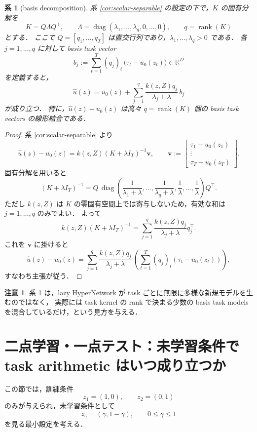 \documentclass[a4paper,11pt]{bxjsarticle}
\newtheorem{corollary}[theorem]{系}
\theoremstyle{definition}
\newtheorem{remark}[theorem]{注意}
\DeclareMathOperator{\rank}{rank}
\DeclareMathOperator{\diag}{diag}
\begin{document}
\begin{corollary}[basis decomposition]
\label{cor:basis-decomposition}
系 \ref{cor:scalar-separable} の設定の下で，$K$ の固有分解を
\[
K = Q\Lambda Q^\top,\qquad
\Lambda=\diag(\lambda_1,\dots,\lambda_q,0,\dots,0),\qquad q=\rank(K)
\]
とする．
ここで $Q=[q_1,\dots,q_T]$ は直交行列であり，$\lambda_1,\dots,\lambda_q>0$ である．
各 $j=1,\dots,q$ に対して basis task vector
\[
b_j:=\sum_{t=1}^T (q_j)_t\,\bigl(\tau_t-u_0(z_t)\bigr)\in\mathbb{R}^D
\]
を定義すると，
\[
\hat u(z)
=
u_0(z)+\sum_{j=1}^q \frac{k(z,Z)q_j}{\lambda_j+\lambda}\,b_j
\]
が成り立つ．
特に，$\hat u(z)-u_0(z)$ は高々 $q=\rank(K)$ 個の basis task vectors の線形結合である．
\end{corollary}

\begin{proof}
系 \ref{cor:scalar-separable} より
\[
\hat u(z)-u_0(z)
=
k(z,Z)(K+\lambda I_T)^{-1}\mathbf{v},
\qquad
\mathbf{v}:=
\begin{bmatrix}
\tau_1-u_0(z_1)\\
\vdots\\
\tau_T-u_0(z_T)
\end{bmatrix}.
\]
固有分解を用いると
\[
(K+\lambda I_T)^{-1}
=
Q\,\diag\!\left(\frac1{\lambda_1+\lambda},\dots,\frac1{\lambda_q+\lambda},
\frac1{\lambda},\dots,\frac1{\lambda}\right)Q^\top.
\]
ただし $k(z,Z)$ は $K$ の零固有空間上では寄与しないため，有効な和は $j=1,\dots,q$ のみでよい．
よって
\[
k(z,Z)(K+\lambda I_T)^{-1}
=
\sum_{j=1}^q \frac{k(z,Z)q_j}{\lambda_j+\lambda} q_j^\top.
\]
これを $\mathbf{v}$ に掛けると
\[
\hat u(z)-u_0(z)
=
\sum_{j=1}^q \frac{k(z,Z)q_j}{\lambda_j+\lambda}\,
\left(\sum_{t=1}^T (q_j)_t(\tau_t-u_0(z_t))\right),
\]
すなわち主張が従う．
\end{proof}

\begin{remark}
系 \ref{cor:basis-decomposition} は，lazy HyperNetwork が task ごとに無限に多様な新規モデルを生むのではなく，
実際には task kernel の rank で決まる少数の basis task models を混合しているだけ，という見方を与える．
\end{remark}

\section{二点学習・一点テスト：未学習条件で task arithmetic はいつ成り立つか}

この節では，訓練条件
\[
z_1=(1,0),\qquad z_2=(0,1)
\]
のみが与えられ，未学習条件として
\[
z_\gamma=(\gamma,1-\gamma),\qquad 0\le \gamma \le 1
\]
を見る最小設定を考える．
\end{document}
